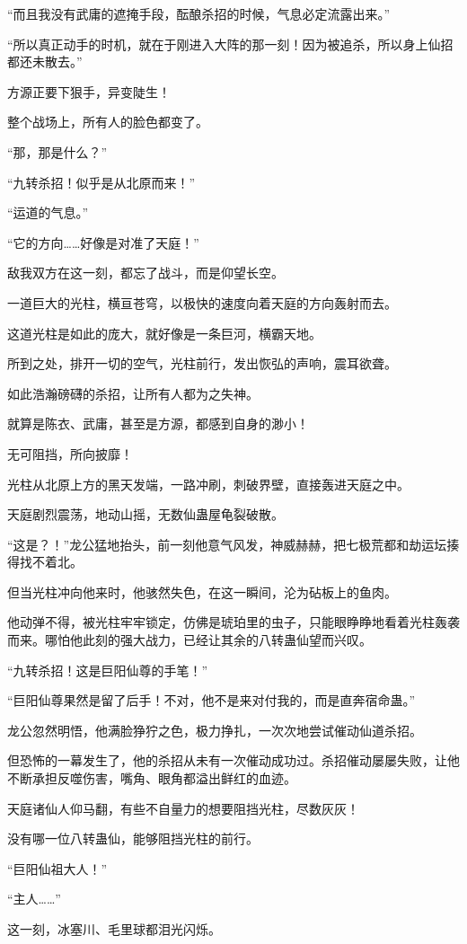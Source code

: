 \begin{this_body}
“而且我没有武庸的遮掩手段，酝酿杀招的时候，气息必定流露出来。”

“所以真正动手的时机，就在于刚进入大阵的那一刻！因为被追杀，所以身上仙招都还未散去。”

方源正要下狠手，异变陡生！

整个战场上，所有人的脸色都变了。

“那，那是什么？”

“九转杀招！似乎是从北原而来！”

“运道的气息。”

“它的方向……好像是对准了天庭！”

敌我双方在这一刻，都忘了战斗，而是仰望长空。

一道巨大的光柱，横亘苍穹，以极快的速度向着天庭的方向轰射而去。

这道光柱是如此的庞大，就好像是一条巨河，横霸天地。

所到之处，排开一切的空气，光柱前行，发出恢弘的声响，震耳欲聋。

如此浩瀚磅礴的杀招，让所有人都为之失神。

就算是陈衣、武庸，甚至是方源，都感到自身的渺小！

无可阻挡，所向披靡！

光柱从北原上方的黑天发端，一路冲刷，刺破界壁，直接轰进天庭之中。

天庭剧烈震荡，地动山摇，无数仙蛊屋龟裂破散。

“这是？！”龙公猛地抬头，前一刻他意气风发，神威赫赫，把七极荒都和劫运坛揍得找不着北。

但当光柱冲向他来时，他骇然失色，在这一瞬间，沦为砧板上的鱼肉。

他动弹不得，被光柱牢牢锁定，仿佛是琥珀里的虫子，只能眼睁睁地看着光柱轰袭而来。哪怕他此刻的强大战力，已经让其余的八转蛊仙望而兴叹。

“九转杀招！这是巨阳仙尊的手笔！”

“巨阳仙尊果然是留了后手！不对，他不是来对付我的，而是直奔宿命蛊。”

龙公忽然明悟，他满脸狰狞之色，极力挣扎，一次次地尝试催动仙道杀招。

但恐怖的一幕发生了，他的杀招从未有一次催动成功过。杀招催动屡屡失败，让他不断承担反噬伤害，嘴角、眼角都溢出鲜红的血迹。

天庭诸仙人仰马翻，有些不自量力的想要阻挡光柱，尽数灰灰！

没有哪一位八转蛊仙，能够阻挡光柱的前行。

“巨阳仙祖大人！”

“主人……”

这一刻，冰塞川、毛里球都泪光闪烁。


\end{this_body}
